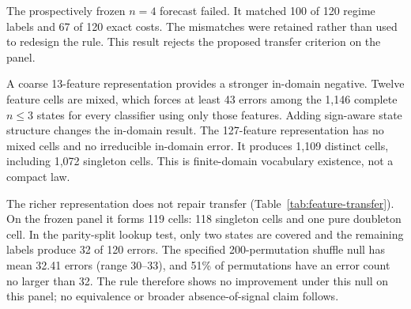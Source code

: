 The prospectively frozen $n=4$ forecast failed.  It matched 100 of 120 regime labels and 67 of 120 exact costs.  The mismatches were retained rather than used to redesign the rule.  This result rejects the proposed transfer criterion on the panel.

A coarse 13-feature representation provides a stronger in-domain negative.  Twelve feature cells are mixed, which forces at least 43 errors among the 1,146 complete $n\leq3$ states for every classifier using only those features.  Adding sign-aware state structure changes the in-domain result.  The 127-feature representation has no mixed cells and no irreducible in-domain error.  It produces 1,109 distinct cells, including 1,072 singleton cells.  This is finite-domain vocabulary existence, not a compact law.

The richer representation does not repair transfer (Table~\ref{tab:feature-transfer}).  On the frozen panel it forms 119 cells: 118 singleton cells and one pure doubleton cell.  In the parity-split lookup test, only two states are covered and the remaining labels produce 32 of 120 errors.  The specified 200-permutation shuffle null has mean 32.41 errors (range 30--33), and 51\% of permutations have an error count no larger than 32.  The rule therefore shows no improvement under this null on this panel; no equivalence or broader absence-of-signal claim follows.
